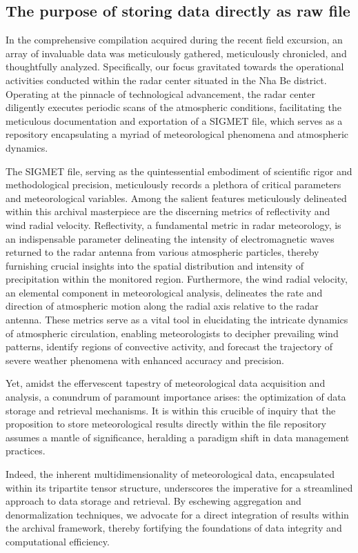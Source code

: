 \subsection{The purpose of storing data directly as raw file}
In the comprehensive compilation acquired during the recent field excursion, an
array of invaluable data was meticulously gathered, meticulously chronicled, and
thoughtfully analyzed. Specifically, our focus gravitated towards the
operational activities conducted within the radar center situated in the Nha Be
district. Operating at the pinnacle of technological advancement, the radar
center diligently executes periodic scans of the atmospheric conditions,
facilitating the meticulous documentation and exportation of a SIGMET file,
which serves as a repository encapsulating a myriad of meteorological phenomena
and atmospheric dynamics.

The SIGMET file, serving as the quintessential embodiment of scientific rigor
and methodological precision, meticulously records a plethora of critical
parameters and meteorological variables. Among the salient features meticulously
delineated within this archival masterpiece are the discerning metrics of
reflectivity and wind radial velocity. Reflectivity, a fundamental metric in
radar meteorology, is an indispensable parameter delineating the intensity of
electromagnetic waves returned to the radar antenna from various atmospheric
particles, thereby furnishing crucial insights into the spatial distribution and
intensity of precipitation within the monitored region. Furthermore, the wind
radial velocity, an elemental component in meteorological analysis, delineates
the rate and direction of atmospheric motion along the radial axis relative to
the radar antenna. These metrics serve as a vital tool in elucidating the
intricate dynamics of atmospheric circulation, enabling meteorologists to
decipher prevailing wind patterns, identify regions of convective activity, and
forecast the trajectory of severe weather phenomena with enhanced accuracy and
precision.

Yet, amidst the effervescent tapestry of meteorological data acquisition and
analysis, a conundrum of paramount importance arises: the optimization of data
storage and retrieval mechanisms. It is within this crucible of inquiry that the
proposition to store meteorological results directly within the file repository
assumes a mantle of significance, heralding a paradigm shift in data management
practices.

Indeed, the inherent multidimensionality of meteorological data, encapsulated
within its tripartite tensor structure, underscores the imperative for a
streamlined approach to data storage and retrieval. By eschewing aggregation and
denormalization techniques, we advocate for a direct integration of results
within the archival framework, thereby fortifying the foundations of data
integrity and computational efficiency.

